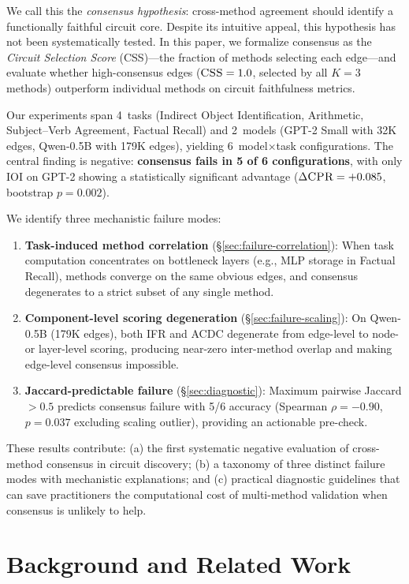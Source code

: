 \documentclass[11pt,a4paper]{article}
\newcommand{\css}{\textsc{CSS}}
\newcommand{\cpr}{\textsc{CPR}}
\newcommand{\acdc}{\textsc{ACDC}}
\newcommand{\ifr}{\textsc{IFR}}
\begin{document}
We call this the \emph{consensus hypothesis}: cross-method agreement should identify a functionally faithful circuit core. Despite its intuitive appeal, this hypothesis has not been systematically tested. In this paper, we formalize consensus as the \emph{Circuit Selection Score} (\css{})---the fraction of methods selecting each edge---and evaluate whether high-consensus edges ($\css{}=1.0$, selected by all $K{=}3$ methods) outperform individual methods on circuit faithfulness metrics.

Our experiments span 4~tasks (Indirect Object Identification, Arithmetic, Subject--Verb Agreement, Factual Recall) and 2~models (GPT-2 Small with 32K edges, Qwen-0.5B with 179K edges), yielding 6~model$\times$task configurations. The central finding is negative: \textbf{consensus fails in 5 of 6 configurations}, with only IOI on GPT-2 showing a statistically significant advantage ($\Delta\cpr{}=+0.085$, bootstrap $p{=}0.002$).

We identify three mechanistic failure modes:
\begin{enumerate}
    \item \textbf{Task-induced method correlation} (\S\ref{sec:failure-correlation}): When task computation concentrates on bottleneck layers (e.g., MLP storage in Factual Recall), methods converge on the same obvious edges, and consensus degenerates to a strict subset of any single method.
    \item \textbf{Component-level scoring degeneration} (\S\ref{sec:failure-scaling}): On Qwen-0.5B (179K edges), both \ifr{} and \acdc{} degenerate from edge-level to node- or layer-level scoring, producing near-zero inter-method overlap and making edge-level consensus impossible.
    \item \textbf{Jaccard-predictable failure} (\S\ref{sec:diagnostic}): Maximum pairwise Jaccard $>0.5$ predicts consensus failure with 5/6 accuracy (Spearman $\rho=-0.90$, $p=0.037$ excluding scaling outlier), providing an actionable pre-check.
\end{enumerate}

These results contribute: (a) the first systematic negative evaluation of cross-method consensus in circuit discovery; (b) a taxonomy of three distinct failure modes with mechanistic explanations; and (c) practical diagnostic guidelines that can save practitioners the computational cost of multi-method validation when consensus is unlikely to help.

\section{Background and Related Work}
\label{sec:related}
\end{document}
